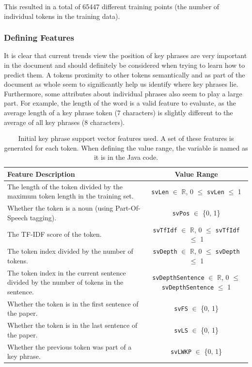 This resulted in a total of 65447 different training points (the number of individual tokens in the training data).

\subsubsection*{Defining Features}
It is clear that current trends view the position of key phrases are very important in the document and should definitely be considered when trying to learn how to predict them. A tokens proximity to other tokens semantically and as part of the document as whole seem to significantly help us identify where key phrases lie. Furthermore, some attributes about individual phrases also seem to play a large part. For example, the length of the word is a valid feature to evaluate, as the average length of a key phrase token (7 characters) is slightly different to the average of all key phrases (8 characters). 

\begin{table}
	\centering
	\begin{tabular}{ C{7cm} | c }
		\textbf{Feature Description} & \textbf{Value Range} \\
		\hline
		The length of the token divided by the maximum token length in the training set. & \texttt{svLen} $\in$ $\mathbb{R}$,  0 $\leq$ \texttt{svLen} $\leq$ 1 \\
		\hline
     	Whether the token is a noun (using Part-Of-Speech tagging). & \texttt{svPos} $\in$ \{0, 1\} \\
     	\hline
     	The TF-IDF score of the token. & \texttt{svTfIdf} $\in$ $\mathbb{R}$,  0 $\leq$ \texttt{svTfIdf} $\leq$ 1 \\
     	\hline
     	The token index divided by the number of tokens. & \texttt{svDepth} $\in$ $\mathbb{R}$,  0 $\leq$ \texttt{svDepth} $\leq$ 1 \\
     	\hline
     	The token index in the current sentence divided by the number of tokens in the sentence. & \texttt{svDepthSentence} $\in$ $\mathbb{R}$,  0 $\leq$ \texttt{svDepthSentence} $\leq$ 1 \\
     	\hline
		Whether the token is in the first sentence of the paper. & \texttt{svFS} $\in$ \{0, 1\} \\
		\hline
     	Whether the token is in the last sentence of the paper. & \texttt{svLS} $\in$ \{0, 1\} \\
     	\hline
     	Whether the previous token was part of a key phrase. & \texttt{svLWKP} $\in$ \{0, 1\} \\
	\end{tabular}
	\caption[Initial Key Phrase SVM Features]{Initial key phrase support vector features used. A set of these features is generated for each token. When defining the value range, the variable is named as it is in the Java code.}
	\label{table:kpinitsvs}
\end{table}

